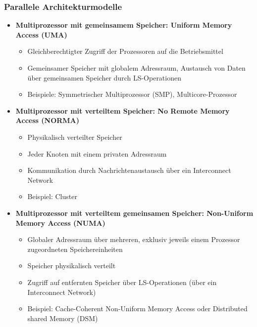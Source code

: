 \subsubsection{Parallele Architekturmodelle}
\begin{itemize}
	\item \textbf{Multiprozessor mit gemeinsamem Speicher: Uniform Memory Access (UMA)}
	\begin{itemize}
		\item Gleichberechtigter Zugriff der Prozessoren auf die Betriebsmittel
		\item Gemeinsamer Speicher mit globalem Adressraum, Austausch von Daten über gemeinsamen Speicher durch LS-Operationen
		\item Beispiele: Symmetrischer Multiprozessor (SMP), Multicore-Prozessor
	\end{itemize}
	\item \textbf{Multiprozessor mit verteiltem Speicher: No Remote Memory Access (NORMA)}
	\begin{itemize}
		\item Physikalisch verteilter Speicher
		\item Jeder Knoten mit einem privaten Adressraum
		\item Kommunikation durch Nachrichtenaustausch über ein Interconnect Network
		\item Beispiel: Cluster
	\end{itemize}
	\item \textbf{Multiprozessor mit verteiltem gemeinsamen Speicher: Non-Uniform Memory Access (NUMA)}
	\begin{itemize}
		\item Globaler Adressraum über mehreren, exklusiv jeweils einem Prozessor zugeordneten Speichereinheiten
		\item Speicher physikalisch verteilt
		\item Zugriff auf entfernten Speicher über LS-Operationen (über ein Interconnect Network)
		\item Beispiel: Cache-Coherent Non-Uniform Memory Access oder Distributed shared Memory (DSM)
	\end{itemize}
\end{itemize}

